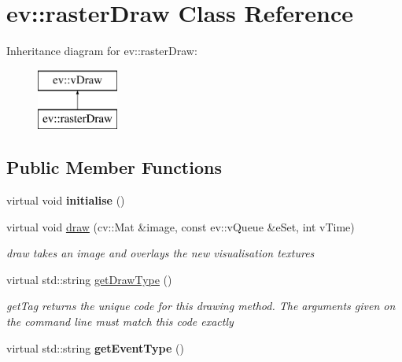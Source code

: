 \hypertarget{classev_1_1rasterDraw}{}\section{ev\+:\+:raster\+Draw Class Reference}
\label{classev_1_1rasterDraw}
Inheritance diagram for ev\+:\+:raster\+Draw\+:\begin{figure}[H]
\begin{center}
\leavevmode
\includegraphics[height=2.000000cm]{classev_1_1rasterDraw}
\end{center}
\end{figure}
\subsection*{Public Member Functions}
\begin{DoxyCompactItemize}
\item 
\mbox{\label{classev_1_1rasterDraw_a7b1e9d355a0c8ea0affd2fd70e77f408}} 
virtual void {\bfseries initialise} ()
\item 
virtual void \hyperlink{classev_1_1rasterDraw_a0cc698fe53b645a8a1ed8cdb40c8b7a9}{draw} (cv\+::\+Mat \&image, const ev\+::v\+Queue \&e\+Set, int v\+Time)
\begin{DoxyCompactList}\small\item\em draw takes an image and overlays the new visualisation textures \end{DoxyCompactList}\item 
virtual std\+::string \hyperlink{classev_1_1rasterDraw_a687569e3beafa6aa9e73e3eeaad64d59}{get\+Draw\+Type} ()
\begin{DoxyCompactList}\small\item\em get\+Tag returns the unique code for this drawing method. The arguments given on the command line must match this code exactly \end{DoxyCompactList}\item 
\mbox{\label{classev_1_1rasterDraw_a669ab1be35fbe7f32d172380dc78553a}} 
virtual std\+::string {\bfseries get\+Event\+Type} ()
\end{DoxyCompactItemize}
